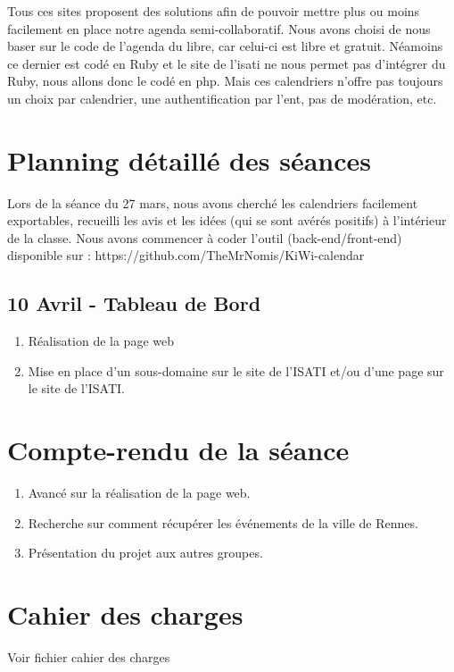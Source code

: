 \documentclass[a4paper,10pt]{article}
\begin{document}
Tous ces sites proposent des solutions afin de pouvoir mettre plus ou moins facilement en place notre agenda semi-collaboratif. Nous avons choisi de nous baser sur le code de l'agenda du libre, car celui-ci est libre et gratuit. Néamoins ce dernier est codé en Ruby et le site de l'isati ne nous permet pas d'intégrer du Ruby, nous allons donc le codé en php. Mais ces calendriers n'offre pas toujours un choix par calendrier, une authentification par l'ent, pas de modération, etc.


\section{Planning détaillé des séances}
Lors de la séance du 27 mars, nous avons cherché les calendriers facilement exportables, recueilli les avis et les idées (qui se sont avérés positifs) à l'intérieur de la classe. Nous avons commencer à coder l'outil (back-end/front-end) disponible sur : https://github.com/TheMrNomis/KiWi-calendar
\subsection*{10 Avril - Tableau de Bord }
  \begin{enumerate}
    \item Réalisation de la page web
    \item Mise en place d'un sous-domaine sur le site de l'ISATI et/ou d'une page sur le site de l'ISATI.
  \end{enumerate}

\section{Compte-rendu de la s\'eance}
  \begin{enumerate}
    \item Avancé sur la réalisation de la page web.
    \item Recherche sur comment récupérer les événements de la ville de Rennes.
    \item Présentation du projet aux autres groupes.
  \end{enumerate}

\section{Cahier des charges}
Voir fichier cahier des charges
\end{document}
